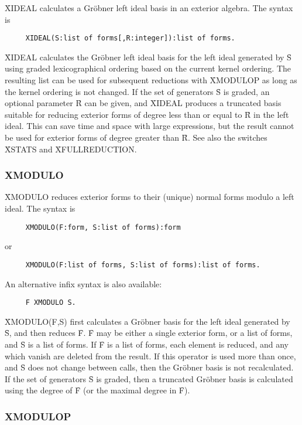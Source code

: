 \documentclass[11pt,letterpaper]{book}
\makeatletter
\newcommand{\underscore}{\_}
\newcommand{\ttindex}[1]{{\renewcommand{\_}{\protect\underscore}%
                          \index{#1@{\tt #1}}}}
\makeatother
\begin{document}
\f{XIDEAL} calculates a Gr\"obner left ideal basis in
an exterior algebra. The syntax is\ttindex{XIDEAL}
{\small\begin{verbatim}
     XIDEAL(S:list of forms[,R:integer]):list of forms.
\end{verbatim}}
\f{XIDEAL} calculates the Gr\"obner left ideal basis for the left ideal
generated by \f{S} using graded lexicographical ordering based on the
current kernel ordering.  The resulting list can be used for subsequent
reductions with \f{XMODULOP} as long as the kernel ordering is not
changed.  If the set of generators \f{S} is graded, an optional parameter
\f{R} can be given, and \f{XIDEAL} produces a truncated basis suitable for
reducing exterior forms of degree less than or equal to \f{R} in the left
ideal.  This can save time and space with large expressions, but the result
cannot be used for exterior forms of degree greater than \f{R}.  See also
the switches \f{XSTATS} and \f{XFULLREDUCTION}.


\subsubsection*{XMODULO}

\f{XMODULO} reduces exterior forms to their (unique) normal forms modulo a
left ideal. The syntax is\ttindex{XMODULO}
{\small\begin{verbatim}
     XMODULO(F:form, S:list of forms):form
\end{verbatim}}
or
{\small\begin{verbatim}
     XMODULO(F:list of forms, S:list of forms):list of forms.
\end{verbatim}}
An alternative infix syntax is also available:
{\small\begin{verbatim}
     F XMODULO S.
\end{verbatim}}
\f{XMODULO(F,S)} first calculates a Gr\"obner basis for the left ideal
generated by \f{S}, and then reduces \f{F}.  \f{F} may be either a single
exterior form, or a list of forms, and \f{S} is a list of forms.  If \f{F}
is a list of forms, each element is reduced, and any which vanish are
deleted from the result.  If this operator is used more than once, and
\f{S} does not change between calls, then the Gr\"obner basis is not
recalculated.  If the set of generators \f{S} is graded, then a truncated
Gr\"obner basis is calculated using the degree of \f{F} (or the maximal
degree in \f{F}).

\subsubsection*{XMODULOP}
\end{document}
